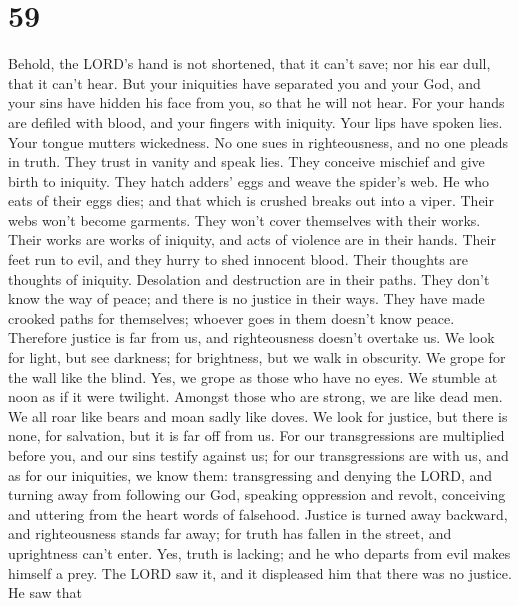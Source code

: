 \hypertarget{section-55}{%
\section{59}\label{section-55}}

 Behold, the LORD's hand is not shortened, that it can't
save; nor his ear dull, that it can't hear.  But your
iniquities have separated you and your God, and your sins have hidden
his face from you, so that he will not hear.  For your hands
are defiled with blood, and your fingers with iniquity. Your lips have
spoken lies. Your tongue mutters wickedness.  No one sues in
righteousness, and no one pleads in truth. They trust in vanity and
speak lies. They conceive mischief and give birth to iniquity.
 They hatch adders' eggs and weave the spider's web. He who
eats of their eggs dies; and that which is crushed breaks out into a
viper.  Their webs won't become garments. They won't cover
themselves with their works. Their works are works of iniquity, and acts
of violence are in their hands.  Their feet run to evil, and
they hurry to shed innocent blood. Their thoughts are thoughts of
iniquity. Desolation and destruction are in their paths. 
They don't know the way of peace; and there is no justice in their ways.
They have made crooked paths for themselves; whoever goes in them
doesn't know peace.  Therefore justice is far from us, and
righteousness doesn't overtake us. We look for light, but see darkness;
for brightness, but we walk in obscurity.  We grope for the
wall like the blind. Yes, we grope as those who have no eyes. We stumble
at noon as if it were twilight. Amongst those who are strong, we are
like dead men.  We all roar like bears and moan sadly like
doves. We look for justice, but there is none, for salvation, but it is
far off from us.  For our transgressions are multiplied
before you, and our sins testify against us; for our transgressions are
with us, and as for our iniquities, we know them: 
transgressing and denying the LORD, and turning away from following our
God, speaking oppression and revolt, conceiving and uttering from the
heart words of falsehood.  Justice is turned away backward,
and righteousness stands far away; for truth has fallen in the street,
and uprightness can't enter.  Yes, truth is lacking; and he
who departs from evil makes himself a prey. The LORD saw it, and it
displeased him that there was no justice.  He saw that
